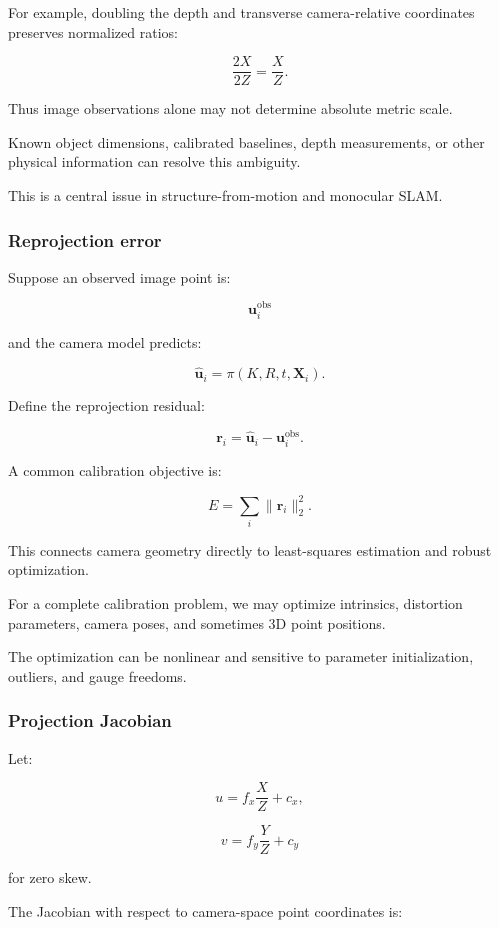 For example, doubling the depth and transverse camera-relative coordinates preserves normalized ratios:

\[
 \frac{2X}{2Z}=\frac XZ.
\]

Thus image observations alone may not determine absolute metric scale.

Known object dimensions, calibrated baselines, depth measurements, or other physical information can resolve this ambiguity.

This is a central issue in structure-from-motion and monocular SLAM.

\subsubsection{Reprojection error}\label{reprojection-error}

Suppose an observed image point is:

\[
 \mathbf u_i^{\mathrm{obs}}
\]

and the camera model predicts:

\[
 \hat{\mathbf u}_i= \pi(K,R,t,\mathbf X_i).
\]

Define the reprojection residual:

\[
 \boxed{ \mathbf r_i= \hat{\mathbf u}_i-\mathbf u_i^{\mathrm{obs}} }.
\]

A common calibration objective is:

\[
 \boxed{ E= \sum_i \|\mathbf r_i\|_2^2 }.
\]

This connects camera geometry directly to least-squares estimation and robust optimization.

For a complete calibration problem, we may optimize intrinsics, distortion parameters, camera poses, and sometimes 3D point positions.

The optimization can be nonlinear and sensitive to parameter initialization, outliers, and gauge freedoms.

\subsubsection{Projection Jacobian}\label{projection-jacobian}

Let:

\[
 u=f_x\frac XZ+c_x,
\]

\[
 v=f_y\frac YZ+c_y
\]

for zero skew.

The Jacobian with respect to camera-space point coordinates is:

